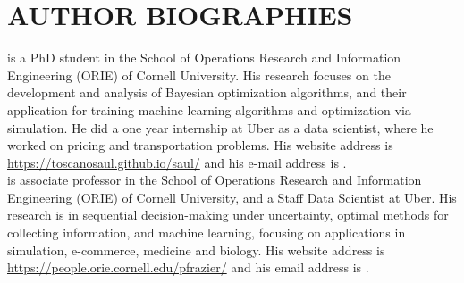 \documentclass{wscpaperproc}
\theoremstyle{wsc}
\begin{document}



\section*{AUTHOR BIOGRAPHIES}


 is a PhD student in the School of Operations Research and Information Engineering (ORIE) of Cornell University. His research focuses on the development and analysis of Bayesian optimization algorithms, and their application for training machine learning algorithms and optimization via simulation. He did a one year internship at Uber as a data scientist, where he worked on pricing and transportation problems. His website address is \href{https://toscanosaul.github.io/saul/}{https://toscanosaul.github.io/saul/} and his e-mail address is . \\


 is associate professor in
the School of Operations Research and Information Engineering (ORIE) of Cornell University, and a Staff Data Scientist at Uber. His research is in sequential decision-making under uncertainty, optimal methods for collecting information, and machine learning, focusing on applications in simulation, e-commerce, medicine and biology. His website address is \href{https://people.orie.cornell.edu/pfrazier/}{https://people.orie.cornell.edu/pfrazier/} and his email address is .
\end{document}
